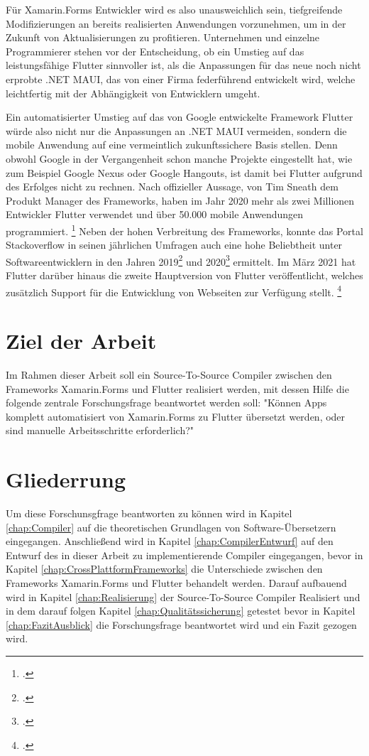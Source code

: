 Für Xamarin.Forms Entwickler wird es also unausweichlich sein,  tiefgreifende Modifizierungen an bereits realisierten Anwendungen vorzunehmen,  um in der Zukunft von Aktualisierungen zu profitieren.  Unternehmen und einzelne Programmierer stehen vor der Entscheidung,  ob ein Umstieg auf das leistungsfähige Flutter sinnvoller ist,  als die Anpassungen für das neue noch nicht erprobte .NET MAUI,  das von einer Firma federführend entwickelt wird,  welche leichtfertig mit der Abhängigkeit von Entwicklern umgeht.

Ein automatisierter Umstieg auf das von Google entwickelte Framework Flutter würde also nicht nur die Anpassungen an .NET MAUI vermeiden,  sondern die mobile Anwendung auf eine vermeintlich zukunftssichere Basis stellen.  Denn obwohl Google in der Vergangenheit schon manche Projekte eingestellt hat,  wie zum Beispiel Google Nexus oder Google Hangouts,  ist damit bei Flutter aufgrund des Erfolges nicht zu rechnen.  Nach offizieller Aussage, von Tim Sneath dem Produkt Manager des Frameworks,  haben im Jahr 2020 mehr als zwei Millionen Entwickler Flutter verwendet und über 50.000 mobile Anwendungen programmiert. \footcite[Vgl.][Abgerufen am 28.10.2020]{Sneath2020} Neben der hohen Verbreitung des Frameworks,  konnte das Portal Stackoverflow in seinen jährlichen Umfragen auch eine hohe Beliebtheit unter Softwareentwicklern in den Jahren 2019\footcite[Vgl.][Abgerufen am 28.10.2020]{Stack2019} und 2020\footcite[Vgl.][Abgerufen am 28.10.2020]{Stack2020} ermittelt.  Im März 2021 hat Flutter darüber hinaus die zweite Hauptversion von Flutter veröffentlicht,  welches zusätzlich Support für die Entwicklung von Webseiten zur Verfügung stellt. \footcite[Vgl.][Abgerufen am 28.10.2020]{GoogleFlutter2}


\section{Ziel der Arbeit}
Im Rahmen dieser Arbeit soll ein Source-To-Source Compiler zwischen den Frameworks Xamarin.Forms und Flutter realisiert werden, mit dessen Hilfe die folgende zentrale Forschungsfrage beantwortet werden soll: "Können Apps komplett automatisiert von Xamarin.Forms zu Flutter übersetzt werden, oder sind manuelle Arbeitsschritte erforderlich?"

\section{Gliederrung}
Um diese Forschunsgfrage beantworten zu können wird in Kapitel \ref{chap:Compiler} auf die theoretischen Grundlagen von Software-Übersetzern eingegangen.  Anschließend wird in Kapitel \ref{chap:CompilerEntwurf} auf den Entwurf des in dieser Arbeit zu implementierende Compiler eingegangen, bevor in Kapitel \ref{chap:CrossPlattformFrameworks} die Unterschiede zwischen den Frameworks Xamarin.Forms und Flutter behandelt werden.  Darauf aufbauend wird in Kapitel \ref{chap:Realisierung} der Source-To-Source Compiler Realisiert und in dem darauf folgen Kapitel \ref{chap:Qualitätssicherung} getestet bevor in Kapitel \ref{chap:FazitAusblick} die Forschungsfrage beantwortet wird und ein Fazit gezogen wird. 